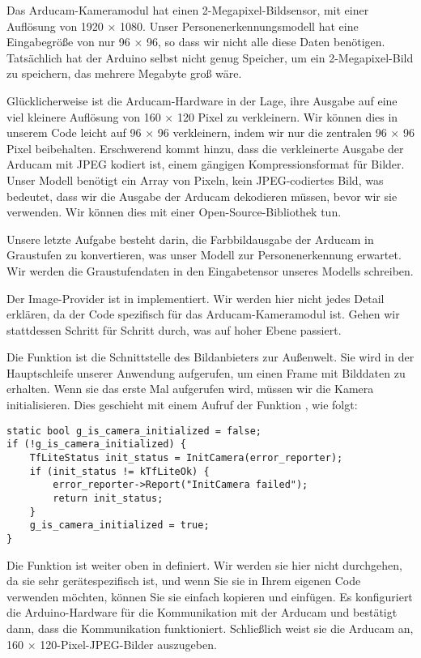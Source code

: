Das Arducam-Kameramodul hat einen 2-Megapixel-Bildsensor, mit einer Auflösung von 1920 × 1080. Unser Personenerkennungsmodell hat eine Eingabegröße von nur 96 × 96, so dass wir nicht alle diese Daten benötigen. Tatsächlich hat der Arduino selbst nicht genug Speicher, um ein 2-Megapixel-Bild zu speichern, das mehrere Megabyte groß wäre.

Glücklicherweise ist die Arducam-Hardware in der Lage, ihre Ausgabe auf eine viel kleinere Auflösung von 160 × 120 Pixel zu verkleinern. Wir können dies in unserem Code leicht auf 96 × 96 verkleinern, indem wir nur die zentralen 96 × 96 Pixel beibehalten. Erschwerend kommt hinzu, dass die verkleinerte Ausgabe der Arducam mit JPEG kodiert ist, einem gängigen Kompressionsformat für Bilder. Unser Modell benötigt ein Array von Pixeln, kein JPEG-codiertes Bild, was bedeutet, dass wir die Ausgabe der Arducam dekodieren müssen, bevor wir sie verwenden. Wir können dies mit einer Open-Source-Bibliothek tun.

Unsere letzte Aufgabe besteht darin, die Farbbildausgabe der Arducam in Graustufen zu konvertieren, was unser Modell zur Personenerkennung erwartet. Wir werden die Graustufendaten in den Eingabetensor unseres Modells schreiben.

Der Image-Provider ist in  implementiert. Wir werden hier nicht jedes Detail erklären, da der Code spezifisch für das Arducam-Kameramodul ist. Gehen wir stattdessen Schritt für Schritt durch, was auf hoher Ebene passiert.

Die Funktion  ist die Schnittstelle des Bildanbieters zur Außenwelt. Sie wird in der Hauptschleife unserer Anwendung aufgerufen, um einen Frame mit Bilddaten zu erhalten. Wenn sie das erste Mal aufgerufen wird, müssen wir die Kamera initialisieren. Dies geschieht mit einem Aufruf der Funktion , wie folgt:




\begin{code}
    \begin{lstlisting}
static bool g_is_camera_initialized = false;
if (!g_is_camera_initialized) {
    TfLiteStatus init_status = InitCamera(error_reporter);
    if (init_status != kTfLiteOk) {
        error_reporter->Report("InitCamera failed");
        return init_status;
    }
    g_is_camera_initialized = true;
}
  \end{lstlisting}
\end{code}

Die Funktion  ist weiter oben in  definiert. Wir werden sie hier nicht durchgehen, da sie sehr gerätespezifisch ist, und wenn Sie sie in Ihrem eigenen Code verwenden möchten, können Sie sie einfach kopieren und einfügen. Es konfiguriert die Arduino-Hardware für die Kommunikation mit der Arducam und bestätigt dann, dass die Kommunikation funktioniert. Schließlich weist sie die Arducam an, 160 × 120-Pixel-JPEG-Bilder auszugeben.

